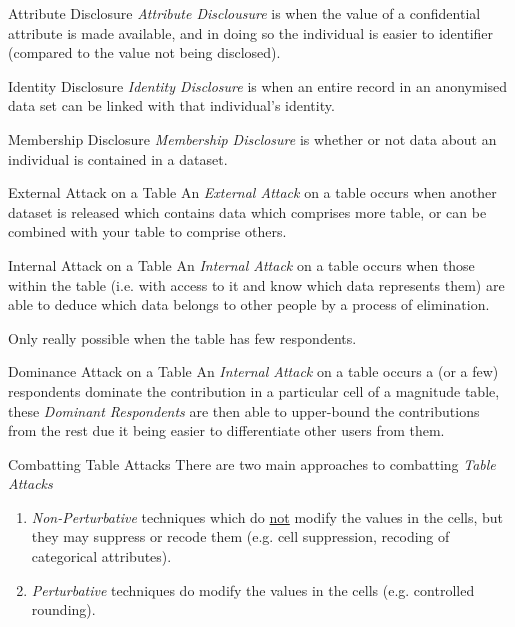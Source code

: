 \documentclass[11pt,a4paper]{article}
\begin{document}
  \begin{definition}{Attribute Disclosure}
    \textit{Attribute Disclousure} is when the value of a confidential attribute is made available, and in doing so the individual is easier to identifier (compared to the value not being disclosed).
  \end{definition}

  \begin{definition}{Identity Disclosure}
    \textit{Identity Disclosure} is when an entire record in an anonymised data set can be linked with that individual's identity.
  \end{definition}

  \begin{definition}{Membership Disclosure}
    \textit{Membership Disclosure} is whether or not data about an individual is contained in a dataset.
  \end{definition}

  \begin{definition}{External Attack on a Table}
    An \textit{External Attack} on a table occurs when another dataset is released which contains data which comprises more table, or can be combined with your table to comprise others.
  \end{definition}

  \begin{definition}{Internal Attack on a Table}
    An \textit{Internal Attack} on a table occurs when those within the table (i.e. with access to it and know which data represents them) are able to deduce which data belongs to other people by a process of elimination.
    \par Only really possible when the table has few respondents.
  \end{definition}

  \begin{definition}{Dominance Attack on a Table}
    An \textit{Internal Attack} on a table occurs a (or a few) respondents dominate the contribution in a particular cell of a magnitude table, these \textit{Dominant Respondents} are then able to upper-bound the contributions from the rest due it being easier to differentiate other users from them.
  \end{definition}

  \begin{proposition}{Combatting Table Attacks}
    There are two main approaches to combatting \textit{Table Attacks}
    \begin{enumerate}
      \item \textit{Non-Perturbative} techniques which do \underline{not} modify the values in the cells, but they may suppress or recode them (e.g. cell suppression, recoding of categorical attributes).
      \item \textit{Perturbative} techniques do modify the values in the cells (e.g. controlled rounding).
    \end{enumerate}
  \end{proposition}
\end{document}
